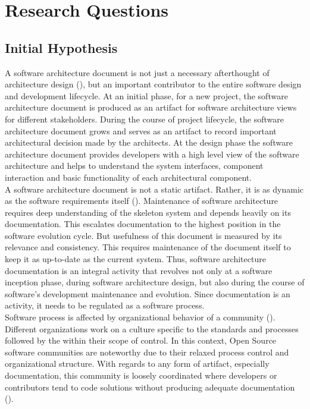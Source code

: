 \chapter{Research Questions}\label{chapter:ResearchQuestions}

\section{Initial Hypothesis}

\indent A software architecture document is not just a necessary afterthought of architecture design (\cite{BachmannDocumentingSoftware2010}), but an important contributor to the entire software design and development lifecycle.  At an initial phase, for a new project, the software architecture document is produced as an artifact for software architecture views for different stakeholders. During the course of project lifecycle, the software architecture document grows and serves as an artifact to record important architectural decision made by the architects. At the design phase the software architecture document provides developers with a high level view of the software architecture and helps to understand the system interfaces, component interaction and basic functionality of each architectural component. 
\\\indent A software architecture document is not a static artifact. Rather, it is as dynamic as the software requirements itself (\cite{BachmannDocumentingSoftware2010}). Maintenance of software architecture requires deep understanding of the skeleton system and depends heavily on its documentation. This escalates documentation to the highest position in the software evolution cycle. But usefulness of this document is measured by its relevance and consistency. This requires maintenance of the document itself to keep it as up-to-date as the current system. Thus, software architecture documentation is an integral activity that revolves not only at a software inception phase, during software architecture design, but also during the course of software’s development maintenance and evolution. Since documentation is an activity, it needs to be regulated as a software process. 
\\\indent Software process is affected by organizational behavior of a community (\cite{Fuggeffa1988}). Different organizations work on a culture specific to the standards and processes followed by the within their scope of control. In this context, Open Source software communities are noteworthy due to their relaxed process control and organizational structure. With regards to any form of artifact, especially documentation, this community is loosely coordinated where developers or contributors tend to code solutions without producing adequate documentation (\cite{6923128}).

